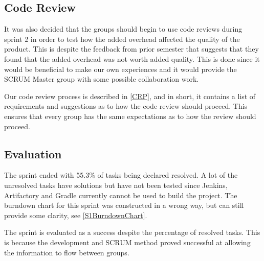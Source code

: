 \subsection{Code Review}
It was also decided that the groups should begin to use code reviews during
sprint 2 in order to test how the added overhead affected the quality of the
product. This is despite the feedback from prior semester that suggests that
they found that the added overhead was not worth added quality. This is done
since it would be beneficial to make our own experiences and it would provide
the SCRUM Master group with some possible collaboration work.\nl

Our code review process is described in \autoref{CRP}, and in short, it contains
a list of requirements and suggestions as to how the code review should proceed.
This ensures that every group has the same expectations as to how the review
should proceed.

\subsection{Evaluation}

The sprint ended with 55.3\% of tasks being declared resolved. A lot of the
unresolved tasks have solutions but have not been tested since Jenkins,
Artifactory and Gradle currently cannot be used to build the project. The
burndown chart for this sprint was constructed in a wrong way, but can still provide
some clarity, see \autoref{S1BurndownChart}.


The sprint is evaluated as a success despite the percentage of resolved
tasks. This is because the development and SCRUM method proved successful
at allowing the information to flow between groups.




